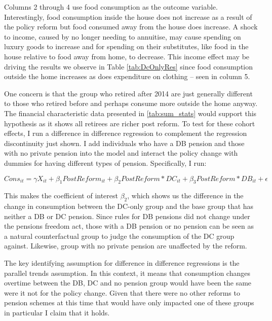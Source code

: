 \documentclass[12pt]{article}
\begin{document}
Columns 2 through 4 use food consumption as the outcome variable. Interestingly,
food consumption inside the house does not increase as a result of the policy
reform but food consumed away from the house does increase. A shock to income,
caused by no longer needing to annuitise, may cause spending on luxury goods to
increase and for spending on their substitutes, like food in the house relative
to food away from home, to decrease. This income effect may be driving the
results we observe in Table \ref{tab:DcOnlyRes} since food consumption outside the
home increases as does expenditure on clothing -- seen in column 5.

One concern is that the group who retired after 2014 are just generally
different to those who retired before and perhaps consume more outside the home
anyway. The financial characteristic data presented in \ref{tab:sum_stats} would
support this hypothesis as it shows all retirees are richer post reform. To test
for these cohort effects, I run a difference in difference regression to
complement the regression discontinuity just shown. I add individuals who have a
DB pension and those with no private pension into the model and interact the
policy change with dummies for having different types of pension. Specifically, I
run:

\begin{equation*}
    Cons_{it} =  \gamma X_{it} + \beta_{1} PostReform_{it} + \beta_{2} PostReform*DC_{it} + \beta_{3} PostReform*DB_{it}  + \epsilon
\end{equation*}


This makes the coefficient of interest $\beta_{2}$, which shows us the
difference in the change in consumption between the DC-only group and the base
group that has neither a DB or DC pension. Since rules for DB pensions did not
change under the pensions freedom act, those with a DB pension or no pension can
be seen as a natural counterfactual group to judge the consumption of the DC
group against. Likewise, group with no private pension are unaffected by the
reform.

The key identifying assumption for difference in difference regressions is the
parallel trends assumption. In this context, it means that consumption changes
overtime between the DB, DC and no pension group would have been the same were
it not for the policy change. Given that there were no other reforms to pension
schemes at this time that would have only impacted one of these groups in
particular I claim that it holds.
\end{document}
